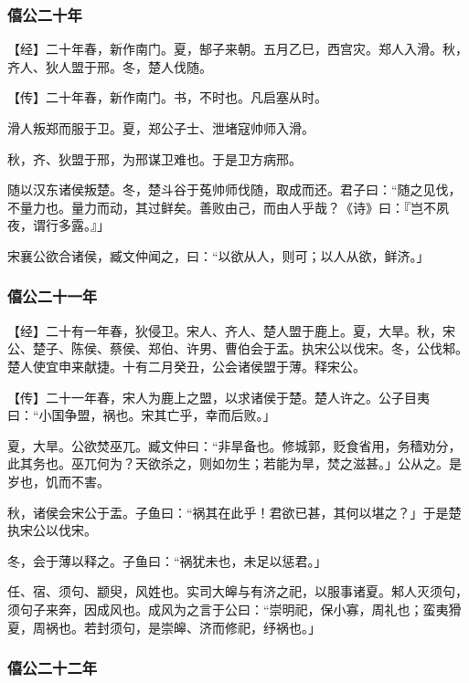 \documentclass[]{article}
\begin{document}
\hypertarget{header-n859}{%
\subsubsection{僖公二十年}\label{header-n859}}

【经】二十年春，新作南门。夏，郜子来朝。五月乙巳，西宫灾。郑人入滑。秋，齐人、狄人盟于邢。冬，楚人伐随。

【传】二十年春，新作南门。书，不时也。凡启塞从时。

滑人叛郑而服于卫。夏，郑公子士、泄堵寇帅师入滑。

秋，齐、狄盟于邢，为邢谋卫难也。于是卫方病邢。

随以汉东诸侯叛楚。冬，楚斗谷于菟帅师伐随，取成而还。君子曰：``随之见伐，不量力也。量力而动，其过鲜矣。善败由己，而由人乎哉？《诗》曰：『岂不夙夜，谓行多露。』」

宋襄公欲合诸侯，臧文仲闻之，曰：``以欲从人，则可；以人从欲，鲜济。」

\hypertarget{header-n868}{%
\subsubsection{僖公二十一年}\label{header-n868}}

【经】二十有一年春，狄侵卫。宋人、齐人、楚人盟于鹿上。夏，大旱。秋，宋公、楚子、陈侯、蔡侯、郑伯、许男、曹伯会于盂。执宋公以伐宋。冬，公伐邾。楚人使宜申来献捷。十有二月癸丑，公会诸侯盟于薄。释宋公。

【传】二十一年春，宋人为鹿上之盟，以求诸侯于楚。楚人许之。公子目夷曰：``小国争盟，祸也。宋其亡乎，幸而后败。」

夏，大旱。公欲焚巫兀。臧文仲曰：``非旱备也。修城郭，贬食省用，务穑劝分，此其务也。巫兀何为？天欲杀之，则如勿生；若能为旱，焚之滋甚。」公从之。是岁也，饥而不害。

秋，诸侯会宋公于盂。子鱼曰：``祸其在此乎！君欲已甚，其何以堪之？」于是楚执宋公以伐宋。

冬，会于薄以释之。子鱼曰：``祸犹未也，未足以惩君。」

任、宿、须句、颛臾，风姓也。实司大皞与有济之祀，以服事诸夏。邾人灭须句，须句子来奔，因成风也。成风为之言于公曰：``崇明祀，保小寡，周礼也；蛮夷猾夏，周祸也。若封须句，是崇皞、济而修祀，纾祸也。」

\hypertarget{header-n877}{%
\subsubsection{僖公二十二年}\label{header-n877}}
\end{document}
